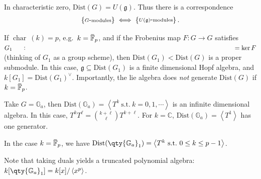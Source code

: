 \begin{remark}

\begin{remark}

In characteristic zero, \(\mathrm{Dist}(G) = U({\mathfrak{g}})\). Thus
there is a correspondence
\begin{align*}   \left\{{\substack{G{\hbox{-}}\text{modules}}}\right\} \iff \left\{{\substack{U({\mathfrak{g}}){\hbox{-}}\text{modules}}}\right\}  .\end{align*}

If \(\operatorname{char}~(k) = p\),
e.g.~\(k = \mkern 1.5mu\overline{\mkern-1.5mu\mathbb{F}\mkern-1.5mu}\mkern 1.5mu_p\),
and if the Frobenius map \(F:G\to G\) satisfies
\(G_1\mathrel{\vcenter{:}}=\ker F\) (thinking of \(G_1\) as a group
scheme), then \(\mathrm{Dist}(G_1) < \mathrm{Dist}(G)\) is a proper
submodule. In this case, \({\mathfrak{g}}\subseteq \mathrm{Dist}(G_1)\)
is a finite dimensional Hopf algebra, and
\(k[G_1] = \mathrm{Dist}(G_1)^\vee\). Importantly, the lie algebra does
\emph{not} generate \(\mathrm{Dist}(G)\) if
\(k = \mkern 1.5mu\overline{\mkern-1.5mu\mathbb{F}\mkern-1.5mu}\mkern 1.5mu_p\).

\end{remark}

\end{remark}

\begin{example}

\begin{example}

Take \(G = {\mathbb{G}}_a\), then
\(\mathrm{Dist}({\mathbb{G}}_a) = \left\langle{T^k ~{\text{s.t.}}~k=0,1,\cdots}\right\rangle\)
is an infinite dimensional algebra. In this case,
\(T^k T^\ell = {k+\ell \choose \ell}T^{k+\ell}\). For
\(k={\mathbb{C}}\),
\(\mathrm{Dist}({\mathbb{G}}_a) = \left\langle{T^1}\right\rangle\) has
one generator.

In the case
\(k = \mkern 1.5mu\overline{\mkern-1.5mu\mathbb{F}\mkern-1.5mu}\mkern 1.5mu_p\),
we have
\(\mathrm{Dist}(\qty{{\mathbb{G}}_a}_1) = \left\langle{T^k ~{\text{s.t.}}~0\leq k \leq p-1}\right\rangle\).

Note that taking duals yields a truncated polynomial algebra:
\(k[\qty{{\mathbb{G}}_a}_1] = k[x] / \left\langle{x^p}\right\rangle\).

\end{example}

\end{example}

